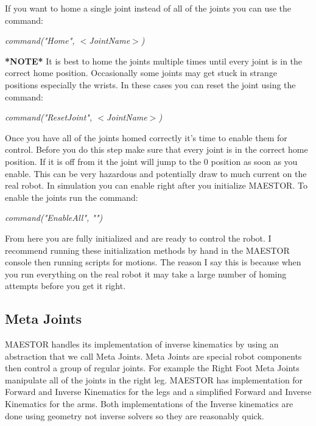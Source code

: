 \documentclass[12pt]{article}
\begin{document}
If you want to home a single joint instead of all of the joints you can use the command:

	\begin{center}
		\textit{command("Home", $<$JointName$>$)}
	\end{center}
	
\noindent \textbf{*NOTE*} It is best to home the joints multiple times until every joint is in the correct home position. Occasionally some joints may get stuck in strange positions especially the wrists. In these cases you can reset the joint using the command:

	\begin{center}
		\textit{command("ResetJoint", $<$JointName$>$)}
	\end{center}

Once you have all of the joints homed correctly it's time to enable them for control. Before you do this step make sure that every joint is in the correct home position. If it is off from it the joint will jump to the 0 position as soon as you enable. This can be very hazardous and potentially draw to much current on the real robot. In simulation you can enable right after you initialize MAESTOR. To enable the joints run the command:

	\begin{center}
		\textit{command("EnableAll", "")}
	\end{center}
	
From here you are fully initialized and are ready to control the robot. I recommend running these initialization methods by hand in the MAESTOR console then running scripts for motions. The reason I say this is because when you run everything on the real robot it may take a large number of homing attempts before you get it right. 

\subsection{Meta Joints}

MAESTOR handles its implementation of inverse kinematics by using an abstraction that we call Meta Joints. Meta Joints are special robot components then control a group of regular joints. For example the Right Foot Meta Joints manipulate all of the joints in the right leg. MAESTOR has implementation for Forward and Inverse Kinematics for the legs and a simplified Forward and Inverse Kinematics for the arms. Both implementations of the Inverse kinematics are done using geometry not inverse solvers so they are reasonably quick. 
\end{document}
